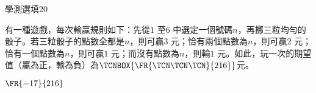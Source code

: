 \begin{QUESTIONS}
\begin{QUESTION}
        \begin{QSOLLIST}
        \end{QSOLLIST}
        \begin{QEMPTYSPACE}
        \end{QEMPTYSPACE}
    \end{QUESTION}
    \begin{QUESTION}
        \begin{ExamInfo}{86}{學測}{選填}{20}
        \end{ExamInfo}
        \begin{ExamAnsRateInfo}{}{}{}{}
        \end{ExamAnsRateInfo}
        \begin{QBODY}
            有一種遊戲，每次輸贏規則如下：先從$1$ 至$6$ 中選定一個號碼$n$，再擲三粒均勻的骰子。若三粒骰子的點數全都是$n$，則可贏$3$ 元；恰有兩個點數為$n$，則可贏$2$ 元；恰有一個點數為$n$，則可贏$1$ 元；而沒有點數為$n$，則輸$1$ 元。如此，玩一次的期望值（贏為正，輸為負）為$\TCNBOX{\FR{\TCN\TCN\TCN}{216}}$元。
        \end{QBODY}
        \begin{QFROMS}
        \end{QFROMS}
        \begin{QTAGS}\end{QTAGS}
        \begin{QANS}
            $\FR{-17}{216}$
        \end{QANS}
        \begin{QSOLLIST}
        \end{QSOLLIST}
        \begin{QEMPTYSPACE}
        \end{QEMPTYSPACE}
    \end{QUESTION}
\end{QUESTIONS}